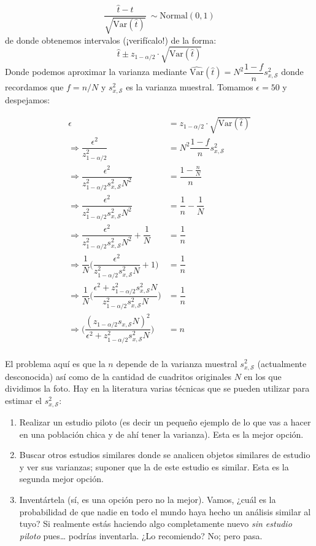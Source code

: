 \documentclass[
]{book}
\begin{document}
\[
\dfrac{\hat{t} - t}{\sqrt{\textrm{Var}(\hat{t})}} ~\sim \textrm{Normal}(0,1)
\]
de donde obtenemos intervalos (¡verifícalo!) de la forma:
\[
 \hat{t} \pm z_{1-\alpha/2}\cdot\sqrt{\textrm{Var}(\hat{t})} 
\]
Donde podemos aproximar la varianza mediante \(\widehat{\text{Var}}(\hat{t}) = N^2\dfrac{1-f}{n} s^2_{x,\mathcal{S}}\) donde recordamos que \(f = n/N\) y \(s^2_{x,\mathcal{S}}\) es la varianza muestral. Tomamos \(\epsilon = 50\) y despejamos:

\begin{equation}\nonumber
\begin{aligned}
 \epsilon & =  z_{1-\alpha/2}\cdot\sqrt{\textrm{Var}(\hat{t})} \\
 \Rightarrow \dfrac{\epsilon^2}{z_{1-\alpha/2}^2} & = N^2\dfrac{1-f}{n} s^2_{x,\mathcal{S}}   \\
 \Rightarrow \dfrac{\epsilon^2}{z_{1-\alpha/2}^2 s^2_{x,\mathcal{S}} N^2} & = \dfrac{1-\frac{n}{N}}{n} \\
 \Rightarrow \dfrac{\epsilon^2}{z_{1-\alpha/2}^2 s^2_{x,\mathcal{S}} N^2} & = \dfrac{1}{n} - \dfrac{1}{N} \\
 \Rightarrow \dfrac{\epsilon^2}{z_{1-\alpha/2}^2 s^2_{x,\mathcal{S}} N^2} + \dfrac{1}{N} & = \dfrac{1}{n}  \\
 \Rightarrow \dfrac{1}{N} \Bigg( \dfrac{\epsilon^2}{z_{1-\alpha/2}^2 s^2_{x,\mathcal{S}} N} + 1 \Bigg) & = \dfrac{1}{n}  \\
  \Rightarrow \dfrac{1}{N} \Bigg( \dfrac{\epsilon^2 + z_{1-\alpha/2}^2 s^2_{x,\mathcal{S}} N}{z_{1-\alpha/2}^2 s^2_{x,\mathcal{S}} N} \Bigg) & = \dfrac{1}{n}  \\
  \Rightarrow  \Bigg( \dfrac{(z_{1-\alpha/2} s_{x,\mathcal{S}} N)^2} {\epsilon^2 + z_{1-\alpha/2}^2 s^2_{x,\mathcal{S}} N}\Bigg) & = n  \\
\end{aligned}
\end{equation}

El problema aquí es que la \(n\) depende de la varianza muestral \(s^2_{x,\mathcal{S}}\) (actualmente desconocida) así como de la cantidad de cuadritos originales \(N\) en los que dividimos la foto. Hay en la literatura varias técnicas que se pueden utilizar para estimar el \(s^2_{x,\mathcal{S}}\):

\begin{enumerate}
\def\labelenumi{\arabic{enumi}.}
\item
  Realizar un estudio piloto (es decir un pequeño ejemplo de lo que vas a hacer en una población chica y de ahí tener la varianza). Esta es la mejor opción.
\item
  Buscar otros estudios similares donde se analicen objetos similares de estudio y ver sus varianzas; suponer que la de este estudio es similar. Esta es la segunda mejor opción.
\item
  Inventártela (sí, es una opción pero no la mejor). Vamos, ¿cuál es la probabilidad de que nadie en todo el mundo haya hecho un análisis similar al tuyo? Si realmente estás haciendo algo completamente nuevo \emph{sin estudio piloto} pues\ldots{} podrías inventarla. ¿Lo recomiendo? No; pero pasa.
\end{enumerate}
\end{document}
